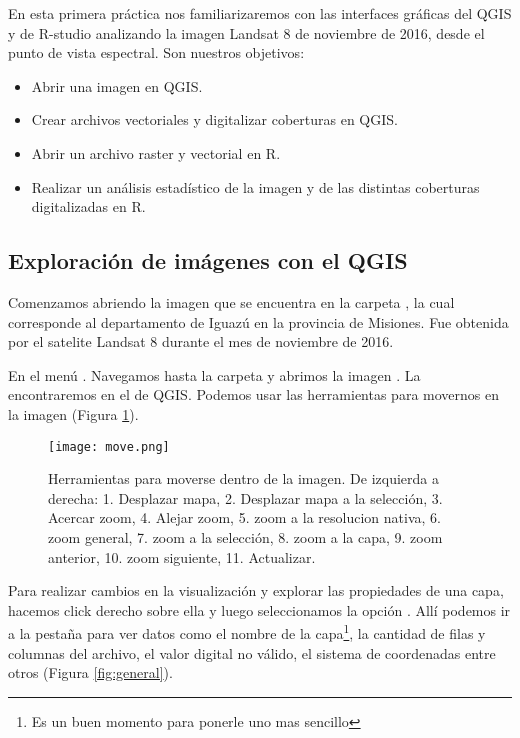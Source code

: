 En esta primera práctica nos familiarizaremos con las interfaces gráficas del
QGIS y de R-studio analizando la imagen Landsat 8 de noviembre de
2016, desde el punto de vista espectral. Son nuestros objetivos:

\begin{itemize}
    \item Abrir una imagen en QGIS.
    \item Crear archivos vectoriales y digitalizar coberturas en QGIS.
    \item Abrir un archivo raster y vectorial en R.
    \item Realizar un análisis estad\'istico de la imagen y de las
        distintas coberturas digitalizadas en R.
\end{itemize}
\subsection{Exploración de im\'agenes con el QGIS}

Comenzamos abriendo la imagen  que se encuentra
en la carpeta , la cual  corresponde al
departamento de Iguaz\'u en la provincia de Misiones. Fue obtenida por
el satelite Landsat 8 durante el mes de noviembre de 2016.

En el menú . Navegamos
hasta la carpeta  y abrimos la imagen
. La encontraremos
en el  de QGIS. Podemos usar las herramientas para
movernos en la imagen (Figura \ref{fig:move}).

\begin{figure}[h!]
\begin{center}
    \texttt{[image: move.png]}
\end{center}
\caption{Herramientas para moverse dentro de la imagen. De izquierda a derecha:
    1. Desplazar mapa, 2. Desplazar mapa a la selecci\'on, 3. Acercar zoom, 4.
    Alejar zoom, 5. zoom a la resolucion nativa, 6. zoom general, 7. zoom a la
    selecci\'on, 8. zoom a la capa, 9. zoom anterior, 10. zoom siguiente, 11.
    Actualizar.}
\label{fig:move}
\end{figure}

Para realizar cambios en la visualizaci\'on y explorar las propiedades de una
capa, hacemos click derecho sobre ella y luego seleccionamos la opci\'on
. All\'i podemos ir a la pestaña
 para ver datos como el nombre de la capa\footnote{Es un buen
momento para ponerle uno mas sencillo}, la cantidad de filas y columnas del
archivo, el valor digital no v\'alido, el sistema de coordenadas
entre otros (Figura \ref{fig:general}).

